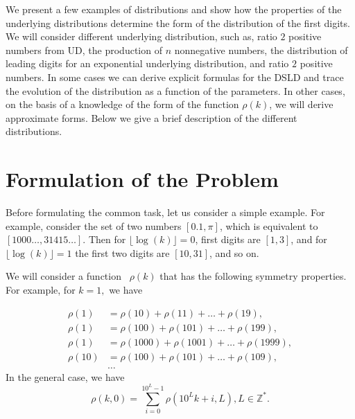 \documentclass[titlepage,fleqn]{article}%
\providecommand{\U}[1]{\protect\rule{.1in}{.1in}}
\begin{document}
We present a few examples of distributions and show how the properties of the
underlying distributions determine the form of the distribution of the first
digits. We will consider different underlying distribution, such as, ratio $2$
positive numbers from UD, the production of $n$ nonnegative numbers, the
distribution of leading digits for an exponential underlying distribution, and
ratio $2$ positive numbers. In some cases we can derive explicit formulas for
the DSLD and trace the evolution of the distribution as a function of the
parameters. In other cases, on the basis of a knowledge of the form of the
function $\rho(k)$, we will derive approximate forms. Below we give a brief
description of the different distributions.

\section{Formulation of the Problem}%

\label{FormulationOf prob}%


Before formulating the common task, let us consider a simple example. For
example, consider the set of two numbers $[0.1,\pi]$, which is equivalent to
$[1000\ldots,31415\ldots]$. Then for $\lfloor\log(k)\rfloor=0$, first digits
are $[1,3]$, and for $\lfloor\log(k)\rfloor=1$ the first two digits are
$[10,31]$, and so on.

We will consider a function \ $\rho(k)$ that has the following symmetry
properties. For example, for $k=1,$ we have%

\begin{align}
\rho(1) &  =\rho(10)+\rho(11)+\ldots+\rho(19),\label{Cond1}\\
\rho(1) &  =\rho(100)+\rho(101)+\ldots+\rho(199),\nonumber\\
\rho(1) &  =\rho(1000)+\rho(1001)+\ldots+\rho(1999),\nonumber\\
\rho(10) &  =\rho(100)+\rho(101)+\ldots+\rho(109),\nonumber\\
&  \ldots\nonumber
\end{align}
In the general case, we have%
\begin{equation}
\rho(k,0)=%
{\displaystyle\sum\limits_{i=0}^{10^{L}-1}}
\rho(10^{L}k+i,L),L\in%
\mathbb{Z}
^{\ast}.\label{MainEq_1}%
\end{equation}
%
\end{document}
